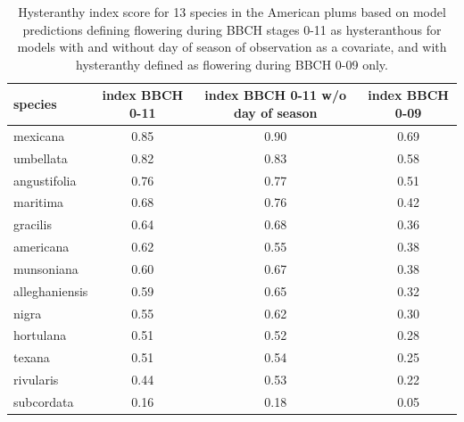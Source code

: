 \documentclass{article}[11pt]
\begin{document}
\begin{table}[ht]
\centering
\begin{tabular}{|lccc|}
  \hline
  species & index BBCH 0-11 & index BBCH 0-11 w/o day of season & index BBCH 0-09 \\ 
  \hline
 mexicana & 0.85 & 0.90 & 0.69 \\ 
  umbellata & 0.82 & 0.83 & 0.58 \\ 
 angustifolia & 0.76 & 0.77 & 0.51 \\ 
  maritima & 0.68 & 0.76 & 0.42 \\ 
 gracilis & 0.64 & 0.68 & 0.36 \\ 
  americana & 0.62 & 0.55 & 0.38 \\ 
  munsoniana & 0.60 & 0.67 & 0.38 \\ 
 alleghaniensis & 0.59 & 0.65 & 0.32 \\ 
  nigra & 0.55 & 0.62 & 0.30 \\ 
   hortulana & 0.51 & 0.52 & 0.28 \\ 
   texana & 0.51 & 0.54 & 0.25 \\ 
   rivularis & 0.44 & 0.53 & 0.22 \\ 
   subcordata & 0.16 & 0.18 & 0.05 \\ 
   \hline
\end{tabular}
\caption{Hysteranthy index score for 13 species in the American plums based on model predictions defining flowering during BBCH stages 0-11 as hysteranthous for models with and without day of season of observation as a covariate, and with hysteranthy defined as flowering during BBCH 0-09 only. }
\label{tab:mod1comps}
\end{table}
\end{document}
